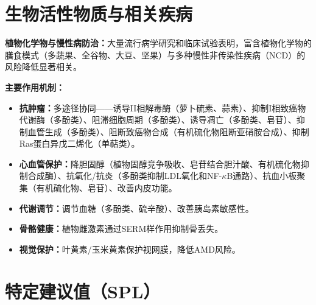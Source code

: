 \section{生物活性物质与相关疾病}

\begin{tipbox}
\textbf{植物化学物与慢性病防治：}大量流行病学研究和临床试验表明，富含植物化学物的膳食模式（多蔬果、全谷物、大豆、坚果）与多种慢性非传染性疾病（NCD）的风险降低显著相关。

\textbf{主要作用机制：}
\begin{itemize}[leftmargin=*]
    \item \textbf{抗肿瘤：}多途径协同——诱导II相解毒酶（萝卜硫素、蒜素）、抑制I相致癌物代谢酶（多酚类）、阻滞细胞周期（多酚类）、诱导凋亡（多酚类、皂苷）、抑制血管生成（多酚类）、阻断致癌物合成（有机硫化物阻断亚硝胺合成）、抑制Ras蛋白异戊二烯化（单萜类）。
    \item \textbf{心血管保护：}降胆固醇（植物固醇竞争吸收、皂苷结合胆汁酸、有机硫化物抑制合成酶）、抗氧化/抗炎（多酚类抑制LDL氧化和NF-$\kappa$B通路）、抗血小板聚集（有机硫化物、皂苷）、改善内皮功能。
    \item \textbf{代谢调节：}调节血糖（多酚类、硫辛酸）、改善胰岛素敏感性。
    \item \textbf{骨骼健康：}植物雌激素通过SERM样作用抑制骨丢失。
    \item \textbf{视觉保护：}叶黄素/玉米黄素保护视网膜，降低AMD风险。
\end{itemize}
\end{tipbox}

\section{特定建议值（SPL）}

